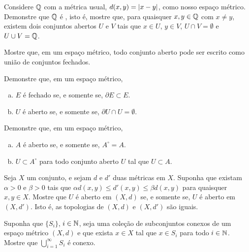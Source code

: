 \begin{exercise}
Considere ${\mathbb{Q}}$ com a métrica usual, $d(x,y) = \lvert {x-y} \rvert$, como nosso espaço
métrico.
Demonstre que ${\mathbb{Q}}$ é
\emph{}, isto é, mostre que, para quaisquer
$x, y \in {\mathbb{Q}}$ com $x \neq y$, existem dois conjuntos abertos $U$ e $V$ tais
que $x \in U$, $y \in V$, $U \cap V = \emptyset$ e $U \cup V = {\mathbb{Q}}$.
\end{exercise}

\begin{exercise}
Mostre que, em um espaço métrico,
todo conjunto aberto pode ser escrito como união de conjuntos fechados.
\end{exercise}

\begin{samepage}
\begin{exercise}
Demonstre que, em um espaço métrico,
\begin{enumerate}[a)]
\item
$E$ é fechado se, e somente se, $\partial E \subset E$.
\item
$U$ é aberto se, e somente se, $\partial U \cap U = \emptyset$.
\end{enumerate}
\end{exercise}
\end{samepage}

\begin{exercise}
Demonstre que, em um espaço métrico,
\begin{enumerate}[a)]
\item
$A$ é aberto se, e somente se, $A^\circ = A$.
\item
$U \subset A^\circ$
para todo conjunto aberto $U$ tal que $U \subset A$.
\end{enumerate}
\end{exercise}

\begin{exercise}
Seja $X$ um conjunto, e sejam $d$ e $d'$ duas métricas em $X$.
Suponha que existam $\alpha > 0$ e $\beta > 0$
tais que $\alpha d(x,y) \leq d'(x,y) \leq \beta d(x,y)$ para quaisquer
$x,y \in X$.
Mostre que $U$ é aberto em $(X,d)$ se, e somente se, $U$ é aberto em $(X,d')$.
Isto é, as topologias de $(X,d)$ e $(X,d')$ são iguais.
\end{exercise}

\begin{exercise}
Suponha que $\{ S_i \}$, $i \in {\mathbb{N}}$,
seja uma coleção de subconjuntos conexos de um espaço métrico $(X,d)$
e que exista $x \in X$ tal que $x \in S_i$ para todo $i \in {\mathbb{N}}$.
Mostre que $\bigcup_{i=1}^\infty S_i$ é conexo.
\end{exercise}

